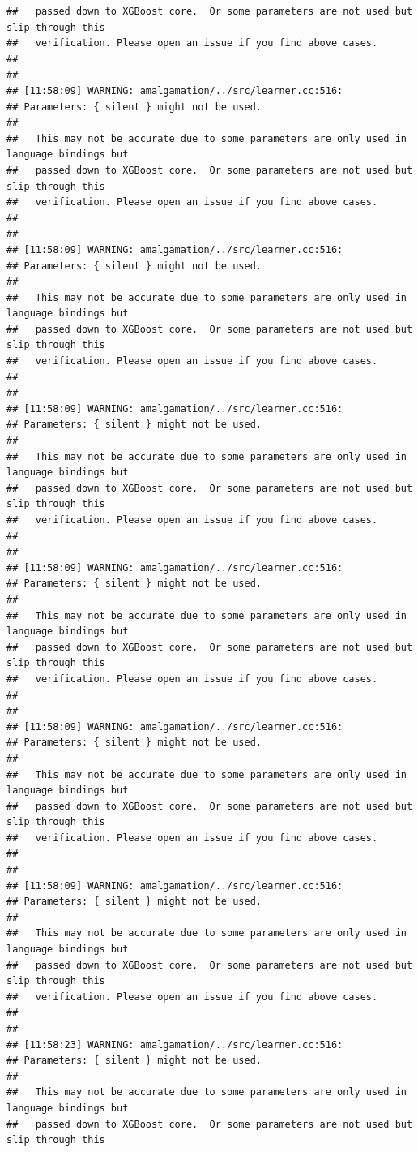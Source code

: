\documentclass[AMS,STIX2COL]{WileyNJD-v2}\usepackage[]{graphicx}\usepackage[]{color}
\makeatletter
\newenvironment{kframe}{%
 \def\at@end@of@kframe{}%
 \ifinner\ifhmode%
  \def\at@end@of@kframe{\end{minipage}}%
  \begin{minipage}{\columnwidth}%
 \fi\fi%
 \def\FrameCommand##1{\hskip\@totalleftmargin \hskip-\fboxsep
 \colorbox{shadecolor}{##1}\hskip-\fboxsep
     \hskip-\linewidth \hskip-\@totalleftmargin \hskip\columnwidth}%
 \MakeFramed {\advance\hsize-\width
   \@totalleftmargin\z@ \linewidth\hsize
   \@setminipage}}%
 {\par\unskip\endMakeFramed%
 \at@end@of@kframe}
\newenvironment{knitrout}{}{} %
\makeatother
\begin{document}
\begin{knitrout}
\begin{kframe}
\begin{verbatim}
##   passed down to XGBoost core.  Or some parameters are not used but slip through this
##   verification. Please open an issue if you find above cases.
## 
## 
## [11:58:09] WARNING: amalgamation/../src/learner.cc:516: 
## Parameters: { silent } might not be used.
## 
##   This may not be accurate due to some parameters are only used in language bindings but
##   passed down to XGBoost core.  Or some parameters are not used but slip through this
##   verification. Please open an issue if you find above cases.
## 
## 
## [11:58:09] WARNING: amalgamation/../src/learner.cc:516: 
## Parameters: { silent } might not be used.
## 
##   This may not be accurate due to some parameters are only used in language bindings but
##   passed down to XGBoost core.  Or some parameters are not used but slip through this
##   verification. Please open an issue if you find above cases.
## 
## 
## [11:58:09] WARNING: amalgamation/../src/learner.cc:516: 
## Parameters: { silent } might not be used.
## 
##   This may not be accurate due to some parameters are only used in language bindings but
##   passed down to XGBoost core.  Or some parameters are not used but slip through this
##   verification. Please open an issue if you find above cases.
## 
## 
## [11:58:09] WARNING: amalgamation/../src/learner.cc:516: 
## Parameters: { silent } might not be used.
## 
##   This may not be accurate due to some parameters are only used in language bindings but
##   passed down to XGBoost core.  Or some parameters are not used but slip through this
##   verification. Please open an issue if you find above cases.
## 
## 
## [11:58:09] WARNING: amalgamation/../src/learner.cc:516: 
## Parameters: { silent } might not be used.
## 
##   This may not be accurate due to some parameters are only used in language bindings but
##   passed down to XGBoost core.  Or some parameters are not used but slip through this
##   verification. Please open an issue if you find above cases.
## 
## 
## [11:58:09] WARNING: amalgamation/../src/learner.cc:516: 
## Parameters: { silent } might not be used.
## 
##   This may not be accurate due to some parameters are only used in language bindings but
##   passed down to XGBoost core.  Or some parameters are not used but slip through this
##   verification. Please open an issue if you find above cases.
## 
## 
## [11:58:23] WARNING: amalgamation/../src/learner.cc:516: 
## Parameters: { silent } might not be used.
## 
##   This may not be accurate due to some parameters are only used in language bindings but
##   passed down to XGBoost core.  Or some parameters are not used but slip through this

\end{verbatim}
\end{kframe}
\end{knitrout}
\end{document}
